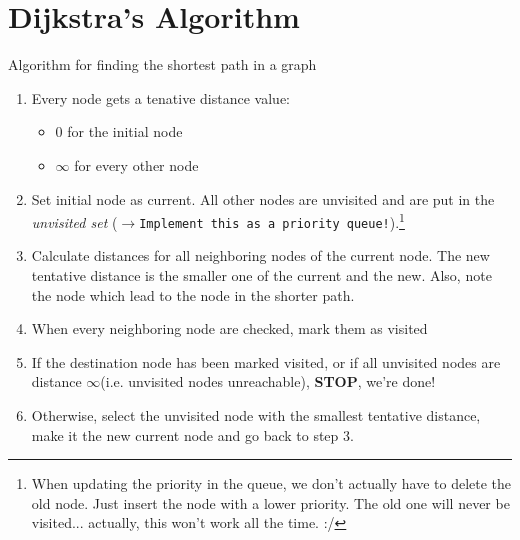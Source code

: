 \documentclass[12pt, a4paper]{scrartcl}
\begin{document}
\section{Dijkstra's Algorithm}
\label{sec:O-notation}
Algorithm for finding the shortest path in a graph
\begin{enumerate}
\item Every node gets a tenative distance value:
  \begin{itemize}
  \item 0 for the initial node
  \item $\infty$ for every other node
  \end{itemize}
\item Set initial node as current. All other nodes are unvisited and are put in the \emph{unvisited set} ($\rightarrow$\texttt{Implement this as a priority queue!}).\footnote{When updating the priority in the queue, we don't actually have to delete the old node. Just insert the node with a lower priority. The old one will never be visited... actually, this won't work all the time. :/}
\item Calculate distances for all neighboring nodes of the current node. The new tentative distance is the smaller one of the current and the new. Also, note the node which lead to the node in the shorter path.
\item When every neighboring node are checked, mark them as visited
\item If the destination node has been marked visited, or if all unvisited nodes are distance $\infty$(i.e. unvisited nodes unreachable), \textbf{STOP}, we're done!
\item Otherwise, select the unvisited node with the smallest tentative distance, make it the new current node and go back to step 3.

\end{enumerate}
\end{document}

